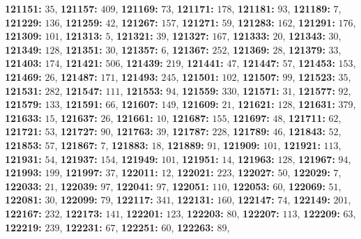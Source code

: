 \textsf{\bfseries 121151:} $35$, \textsf{\bfseries 121157:} $409$, \textsf{\bfseries 121169:} $73$, \textsf{\bfseries 121171:} $178$, \textsf{\bfseries 121181:} $93$, \textsf{\bfseries 121189:} $7$, \textsf{\bfseries 121229:} $136$, \textsf{\bfseries 121259:} $42$, \textsf{\bfseries 121267:} $157$, \textsf{\bfseries 121271:} $59$, \textsf{\bfseries 121283:} $162$, \textsf{\bfseries 121291:} $176$, \textsf{\bfseries 121309:} $101$, \textsf{\bfseries 121313:} $5$, \textsf{\bfseries 121321:} $39$, \textsf{\bfseries 121327:} $167$, \textsf{\bfseries 121333:} $20$, \textsf{\bfseries 121343:} $30$, \textsf{\bfseries 121349:} $128$, \textsf{\bfseries 121351:} $30$, \textsf{\bfseries 121357:} $6$, \textsf{\bfseries 121367:} $252$, \textsf{\bfseries 121369:} $28$, \textsf{\bfseries 121379:} $33$, \textsf{\bfseries 121403:} $174$, \textsf{\bfseries 121421:} $506$, \textsf{\bfseries 121439:} $219$, \textsf{\bfseries 121441:} $47$, \textsf{\bfseries 121447:} $57$, \textsf{\bfseries 121453:} $153$, \textsf{\bfseries 121469:} $26$, \textsf{\bfseries 121487:} $171$, \textsf{\bfseries 121493:} $245$, \textsf{\bfseries 121501:} $102$, \textsf{\bfseries 121507:} $99$, \textsf{\bfseries 121523:} $35$, \textsf{\bfseries 121531:} $282$, \textsf{\bfseries 121547:} $111$, \textsf{\bfseries 121553:} $94$, \textsf{\bfseries 121559:} $330$, \textsf{\bfseries 121571:} $31$, \textsf{\bfseries 121577:} $92$, \textsf{\bfseries 121579:} $133$, \textsf{\bfseries 121591:} $66$, \textsf{\bfseries 121607:} $149$, \textsf{\bfseries 121609:} $21$, \textsf{\bfseries 121621:} $128$, \textsf{\bfseries 121631:} $379$, \textsf{\bfseries 121633:} $15$, \textsf{\bfseries 121637:} $26$, \textsf{\bfseries 121661:} $10$, \textsf{\bfseries 121687:} $155$, \textsf{\bfseries 121697:} $48$, \textsf{\bfseries 121711:} $62$, \textsf{\bfseries 121721:} $53$, \textsf{\bfseries 121727:} $90$, \textsf{\bfseries 121763:} $39$, \textsf{\bfseries 121787:} $228$, \textsf{\bfseries 121789:} $46$, \textsf{\bfseries 121843:} $52$, \textsf{\bfseries 121853:} $57$, \textsf{\bfseries 121867:} $7$, \textsf{\bfseries 121883:} $18$, \textsf{\bfseries 121889:} $91$, \textsf{\bfseries 121909:} $101$, \textsf{\bfseries 121921:} $113$, \textsf{\bfseries 121931:} $54$, \textsf{\bfseries 121937:} $154$, \textsf{\bfseries 121949:} $101$, \textsf{\bfseries 121951:} $14$, \textsf{\bfseries 121963:} $128$, \textsf{\bfseries 121967:} $94$, \textsf{\bfseries 121993:} $199$, \textsf{\bfseries 121997:} $37$, \textsf{\bfseries 122011:} $12$, \textsf{\bfseries 122021:} $223$, \textsf{\bfseries 122027:} $50$, \textsf{\bfseries 122029:} $7$, \textsf{\bfseries 122033:} $21$, \textsf{\bfseries 122039:} $97$, \textsf{\bfseries 122041:} $97$, \textsf{\bfseries 122051:} $110$, \textsf{\bfseries 122053:} $60$, \textsf{\bfseries 122069:} $51$, \textsf{\bfseries 122081:} $30$, \textsf{\bfseries 122099:} $79$, \textsf{\bfseries 122117:} $341$, \textsf{\bfseries 122131:} $160$, \textsf{\bfseries 122147:} $74$, \textsf{\bfseries 122149:} $201$, \textsf{\bfseries 122167:} $232$, \textsf{\bfseries 122173:} $141$, \textsf{\bfseries 122201:} $123$, \textsf{\bfseries 122203:} $80$, \textsf{\bfseries 122207:} $113$, \textsf{\bfseries 122209:} $63$, \textsf{\bfseries 122219:} $239$, \textsf{\bfseries 122231:} $67$, \textsf{\bfseries 122251:} $60$, \textsf{\bfseries 122263:} $89$, 
